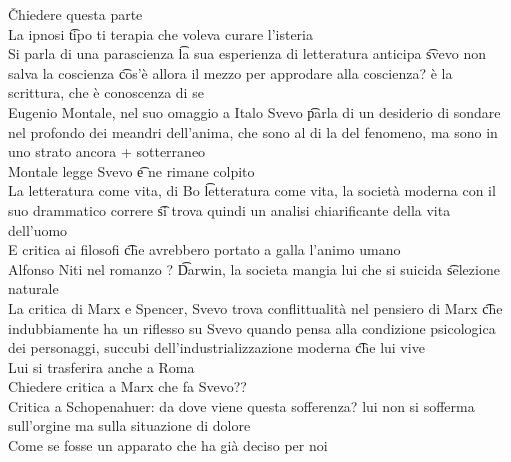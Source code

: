 \documentclass[12pt]{article}
\begin{document}
\v

Chiedere questa parte \\
La ipnosi \t tipo ti terapia che voleva curare l'isteria \\
Si parla di una parascienza \t la sua esperienza di letteratura anticipa \t svevo non salva la coscienza \t cos'è allora il mezzo per approdare alla coscienza? è la scrittura, che è conoscenza di se \\
Eugenio Montale, nel suo omaggio a Italo Svevo \t parla di un desiderio di sondare nel profondo dei meandri dell'anima, che sono al di la del fenomeno, ma sono in uno strato ancora + sotterraneo \\
Montale legge Svevo \t e ne rimane colpito \\
La letteratura come vita, di Bo \t letteratura come vita, la società moderna con il suo drammatico correre \t si trova quindi un analisi chiarificante della vita dell'uomo \\
E critica ai filosofi \t che avrebbero portato a galla l'animo umano \\
Alfonso Niti nel romanzo ? \t Darwin, la societa mangia lui che si suicida \t selezione naturale \\
La critica di Marx e Spencer, Svevo trova conflittualità nel pensiero di Marx \t che indubbiamente ha un riflesso su Svevo quando pensa alla condizione psicologica dei personaggi, succubi dell'industrializzazione moderna \t che lui vive \\
Lui si trasferira anche a Roma \\
Chiedere critica a Marx che fa Svevo?? \\
Critica a Schopenahuer: da dove viene questa sofferenza? lui non si sofferma sull'orgine ma sulla situazione di dolore \\
Come se fosse un apparato che ha già deciso per noi
\end{document}
